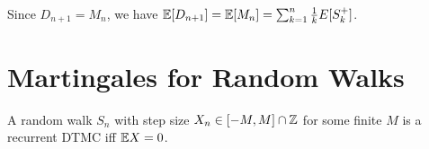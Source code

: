 \documentclass[a4paper,10pt,english]{article}
\begin{document}
\begin{rem} Since $D_{n+1} = M_n$, we have 
$\mathbb{E}[D_{n+1}] =\mathbb{E}[M_n] = \sum_{k=1}^{n} \frac{1}{k}E[S_k^+]$.
\end{rem}
\section{Martingales for Random Walks}
\begin{prop}
A random walk $S_n$ with step size $X_n \in [-M,M]\cap \mathbb{Z}$ for some finite $M$ is a recurrent DTMC iff $\mathbb{E} X = 0$.
\end{prop}
\end{document}
